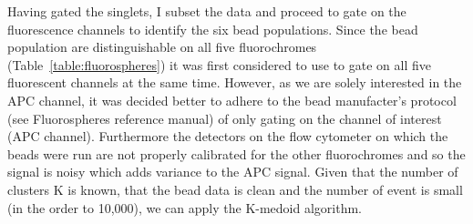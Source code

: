 
Having gated the singlets, I subset the data and proceed to gate on the fluorescence channels to identify the six bead populations.
Since the bead population are distinguishable on all five fluorochromes (Table~\ref{table:fluorospheres}) it was first considered to use to gate on all five fluorescent channels at the same time.
However, as we are solely interested in the APC channel, it was decided better to adhere to the bead manufacter's protocol (see Fluorospheres reference manual) of only gating on the channel of interest (APC channel).
Furthermore the detectors on the flow cytometer on which the beads were run are not properly calibrated for the other fluorochromes and so the signal is noisy which adds variance to the APC signal.
Given that the number of clusters K is known, that the bead data is clean and the number of event is small (in the order to 10,000), we can apply the K-medoid algorithm.



